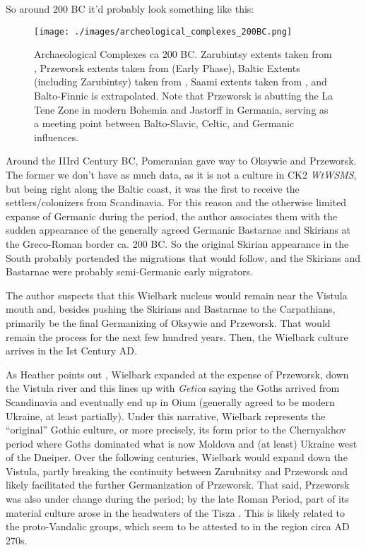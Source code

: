 \documentclass{article}
\newcommand{\wtwsms}{\textit{WtWSMS}}
\begin{document}
	So around 200 BC it’d probably look something like this:
	
	\begin{figure}[h!]
		\centering
		\texttt{[image: ./images/archeological\_complexes\_200BC.png]}
		\caption{Archaeological Complexes ca 200 BC.
			\tiny Zarubintsy extents taken from \cite{IndoEuroEncyclopedia}, Przeworsk extents taken from \cite{PrzeworskHistory} (Early Phase), Baltic Extents (including Zarubintsy) taken from \cite{BalticHydronyms}, Saami extents taken from \cite{LaplandSaami}, and Balto-Finnic is extrapolated.
			Note that Przeworsk is abutting the La Tene Zone in modern Bohemia and Jastorff in Germania, serving as a meeting point between Balto-Slavic, Celtic, and Germanic influences.}
	\end{figure}
	
	Around the IIIrd Century BC, Pomeranian gave way to Oksywie and Przeworsk.
	The former we don’t have as much data, as it is not a culture in CK2 \wtwsms, but being right along the Baltic coast, it was the first to receive the settlers/colonizers from Scandinavia.
	For this reason and the otherwise limited expanse of Germanic during the period, the author associates them with the sudden appearance of the generally agreed Germanic Bastarnae and Skirians at the Greco-Roman border ca. 200 BC.
	So the original Skirian appearance in the South probably portended the migrations that would follow, and the Skirians and Bastarnae were probably semi-Germanic early migrators.
	
	The author suspects that this Wielbark nucleus would remain near the Vistula mouth and, besides pushing the Skirians and Bastarnae to the Carpathians, primarily be the final Germanizing of Oksywie and Przeworsk.
	That would remain the process for the next few hundred years.
	Then, the Wielbark culture arrives in the Ist Century AD.
	
	As Heather points out \cite{HeatherEmpiresAndBarbarians}, Wielbark expanded at the expense of Przeworsk, down the Vistula river and this lines up with \textit{Getica} saying the Goths arrived from Scandinavia and eventually end up in Oium (generally agreed to be modern Ukraine, at least partially).
	Under this narrative, Wielbark represents the “original” Gothic culture, or more precisely, its form prior to the Chernyakhov period where Goths dominated what is now Moldova and (at least) Ukraine west of the Dneiper.
	Over the following centuries, Wielbark would expand down the Vistula, partly breaking the continuity between Zarubnitsy and Przeworsk and likely facilitated the further Germanization of Przeworsk. 
	That said, Przeworsk was also under change during the period; by the late Roman Period, part of its material culture arose in the headwaters of the Tisza \cite{PrzeworskHistory}. This is likely related to the proto-Vandalic groups, which seem to be attested to in the region circa AD 270s.
	
\end{document}

